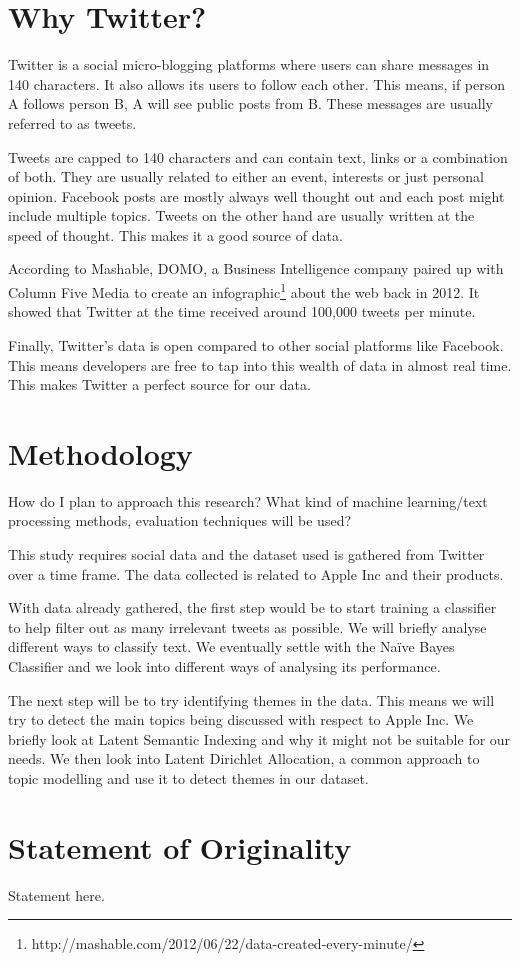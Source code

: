 \section{Why Twitter?}
\label{sec:why_twitter}
Twitter is a social micro-blogging platforms where users can share messages in 140 characters. It
also allows its users to follow each other. This means, if person A follows person B, A will see
public posts from B. These messages are usually referred to as tweets.

Tweets are capped to 140 characters and can contain text, links or a combination of both. They are
usually related to either an event, interests or just personal opinion. Facebook posts are mostly
always well thought out and each post might include multiple topics. Tweets on the other hand are
usually written at the speed of thought. This makes it a good source of data.

According to Mashable, DOMO, a Business Intelligence company paired up with Column Five Media to
create an infographic\footnote{http://mashable.com/2012/06/22/data-created-every-minute/} about the
web back in 2012. It showed that Twitter at the time received around 100,000 tweets per minute.

Finally, Twitter's data is open compared to other social platforms like Facebook. This means
developers are free to tap into this wealth of data in almost real time. This makes Twitter a
perfect source for our data.


\section{Methodology}
\label{sec:methodology}
How do I plan to approach this research? What kind of machine learning/text processing methods,
evaluation techniques will be used?

This study requires social data and the dataset used is gathered from Twitter over a time frame.
The data collected is related to Apple Inc and their products.

With data already gathered, the first step would be to start training a classifier to help filter
out as many irrelevant tweets as possible. We will briefly analyse different ways to classify text.
We eventually settle with the Na\"{i}ve Bayes Classifier and we look into different ways of analysing
its performance.

The next step will be to try identifying themes in the data. This means we will try to detect the
main topics being discussed with respect to Apple Inc. We briefly look at Latent Semantic Indexing
and why it might not be suitable for our needs. We then look into Latent Dirichlet Allocation, a
common approach to topic modelling and use it to detect themes in our dataset.


\section{Statement of Originality}

Statement here.

